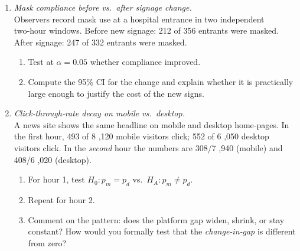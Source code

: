 \documentclass[11pt]{article}
\begin{document}
\begin{enumerate}[label=\textbf{Q\,\arabic*:}, start=16, left=0pt]
\item  \emph{Mask compliance before vs.\ after signage change.} \\
      Observers record mask use at a hospital entrance in two independent two‑hour windows.
      Before new signage: 212 of 356 entrants were masked.
      After signage: 247 of 332 entrants were masked.
      \begin{enumerate}[label=(\alph*)]
          \item Test at $\alpha=0.05$ whether compliance improved.
          \item Compute the 95\% CI for the change and explain whether it is practically large enough to justify the cost of the new signs.
      \end{enumerate}

\item  \emph{Click‑through‑rate decay on mobile vs.\ desktop.} \\
      A news site shows the same headline on mobile and desktop home‑pages.
      In the first hour, 493 of 8 ,120 mobile visitors click; 552 of 6 ,050 desktop visitors click.
      In the \emph{second} hour the numbers are 308/7 ,940 (mobile) and 408/6 ,020 (desktop).
      \begin{enumerate}[label=(\alph*)]
          \item For hour 1, test $H_0{:}p_m=p_d$ vs.\ $H_A{:}p_m\neq p_d$.
          \item Repeat for hour 2.
          \item Comment on the pattern: does the platform gap widen, shrink, or stay constant?
                How would you formally test that the \emph{change‑in‑gap} is different from zero?
      \end{enumerate}

\end{enumerate}
\end{document}
